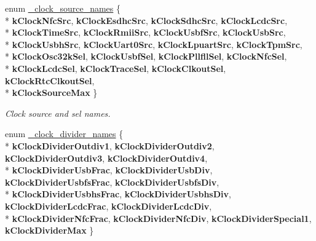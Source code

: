 \begin{DoxyCompactItemize}
\item 
enum \hyperlink{group__sim__hal_ga77ad0e23383945c5b3e677455627c0fe}{\+\_\+clock\+\_\+source\+\_\+names} \{ \\*
{\bfseries k\+Clock\+Nfc\+Src}, 
{\bfseries k\+Clock\+Esdhc\+Src}, 
{\bfseries k\+Clock\+Sdhc\+Src}, 
{\bfseries k\+Clock\+Lcdc\+Src}, 
\\*
{\bfseries k\+Clock\+Time\+Src}, 
{\bfseries k\+Clock\+Rmii\+Src}, 
{\bfseries k\+Clock\+Usbf\+Src}, 
{\bfseries k\+Clock\+Usb\+Src}, 
\\*
{\bfseries k\+Clock\+Usbh\+Src}, 
{\bfseries k\+Clock\+Uart0\+Src}, 
{\bfseries k\+Clock\+Lpuart\+Src}, 
{\bfseries k\+Clock\+Tpm\+Src}, 
\\*
{\bfseries k\+Clock\+Osc32k\+Sel}, 
{\bfseries k\+Clock\+Usbf\+Sel}, 
{\bfseries k\+Clock\+Pllfll\+Sel}, 
{\bfseries k\+Clock\+Nfc\+Sel}, 
\\*
{\bfseries k\+Clock\+Lcdc\+Sel}, 
{\bfseries k\+Clock\+Trace\+Sel}, 
{\bfseries k\+Clock\+Clkout\+Sel}, 
{\bfseries k\+Clock\+Rtc\+Clkout\+Sel}, 
\\*
{\bfseries k\+Clock\+Source\+Max}
 \}\hypertarget{group__sim__hal_ga77ad0e23383945c5b3e677455627c0fe}{}\label{group__sim__hal_ga77ad0e23383945c5b3e677455627c0fe}
\begin{DoxyCompactList}\small\item\em Clock source and sel names. \end{DoxyCompactList}
\item 
enum \hyperlink{group__sim__hal_ga48bb70d28e353a255009c5762b248970}{\+\_\+clock\+\_\+divider\+\_\+names} \{ \\*
{\bfseries k\+Clock\+Divider\+Outdiv1}, 
{\bfseries k\+Clock\+Divider\+Outdiv2}, 
{\bfseries k\+Clock\+Divider\+Outdiv3}, 
{\bfseries k\+Clock\+Divider\+Outdiv4}, 
\\*
{\bfseries k\+Clock\+Divider\+Usb\+Frac}, 
{\bfseries k\+Clock\+Divider\+Usb\+Div}, 
{\bfseries k\+Clock\+Divider\+Usbfs\+Frac}, 
{\bfseries k\+Clock\+Divider\+Usbfs\+Div}, 
\\*
{\bfseries k\+Clock\+Divider\+Usbhs\+Frac}, 
{\bfseries k\+Clock\+Divider\+Usbhs\+Div}, 
{\bfseries k\+Clock\+Divider\+Lcdc\+Frac}, 
{\bfseries k\+Clock\+Divider\+Lcdc\+Div}, 
\\*
{\bfseries k\+Clock\+Divider\+Nfc\+Frac}, 
{\bfseries k\+Clock\+Divider\+Nfc\+Div}, 
{\bfseries k\+Clock\+Divider\+Special1}, 
{\bfseries k\+Clock\+Divider\+Max}
 \}\hypertarget{group__sim__hal_ga48bb70d28e353a255009c5762b248970}{}\label{group__sim__hal_ga48bb70d28e353a255009c5762b248970}

\end{DoxyCompactItemize}
